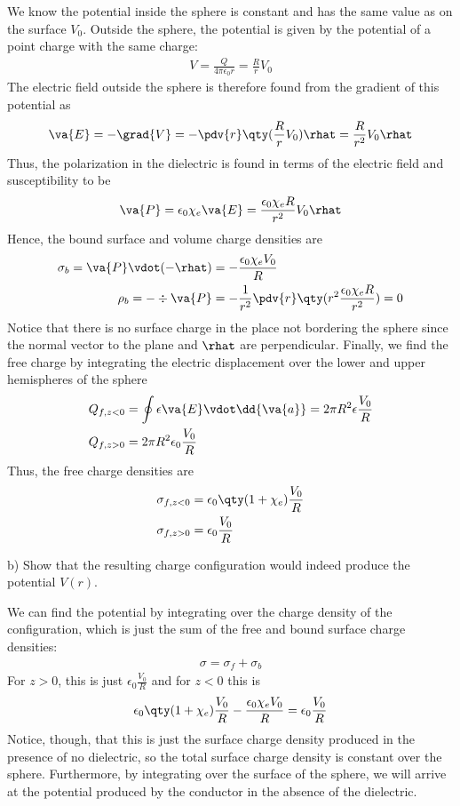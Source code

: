 \documentclass[12pt,a4paper]{article}
\begin{document}
We know the potential inside the sphere is constant and has the same value as on the surface $V_0$. Outside the sphere, the potential is given by the potential of a point charge with the same charge:
\begin{align*}
V = \frac{Q}{4\pi\epsilon_0 r} = \frac{R}{r}V_0
\end{align*}
The electric field outside the sphere is therefore found from the gradient of this potential as
\begin{align*}
\va{E} = -\grad{V} = -\pdv{r}\qty(\frac{R}{r}V_0)\rhat = \frac{R}{r^2}V_0\rhat
\end{align*}
Thus, the polarization in the dielectric is found in terms of the electric field and susceptibility to be
\begin{align*}
\va{P} = \epsilon_0\chi_e\va{E} = \frac{\epsilon_0\chi_eR}{r^2}V_0\rhat
\end{align*}
Hence, the bound surface and volume charge densities are
\begin{align*}
\sigma_b = \va{P} \vdot (-\rhat) &= -\frac{\epsilon_0\chi_eV_0}{R} \\
\rho_b = -\div{\va{P}} &= -\frac{1}{r^2}\pdv{r}\qty(r^2\frac{\epsilon_0\chi_eR}{r^2}) = 0
\end{align*}
Notice that there is no surface charge in the place not bordering the sphere since the normal vector to the plane and $\rhat$ are perpendicular. Finally, we find the free charge by integrating the electric displacement over the lower and upper hemispheres of the sphere
\begin{align*}
Q_{f,z<0} &= \oint \epsilon\va{E} \vdot \dd{\va{a}} = 2\pi R^2\epsilon\frac{V_0}{R} \\
Q_{f,z>0} &= 2\pi R^2\epsilon_0\frac{V_0}{R}
\end{align*}
Thus, the free charge densities are 
\begin{align*}
\sigma_{f,z<0} &= \epsilon_0\qty(1+\chi_e)\frac{V_0}{R} \\
\sigma_{f,z>0} &= \epsilon_0\frac{V_0}{R} 
\end{align*}

b) Show that the resulting charge configuration would indeed produce the potential $V(r)$.

We can find the potential by integrating over the charge density of the configuration, which is just the sum of the free and bound surface charge densities:
\begin{align*}
\sigma = \sigma_f + \sigma_b
\end{align*}
For $z > 0$, this is just $\epsilon_0\frac{V_0}{R}$ and for $z < 0$ this is
\begin{align*}
\epsilon_0\qty(1+\chi_e)\frac{V_0}{R} - \frac{\epsilon_0\chi_eV_0}{R} = \epsilon_0\frac{V_0}{R}
\end{align*}
Notice, though, that this is just the surface charge density produced in the presence of no dielectric, so the total surface charge density is constant over the sphere. Furthermore, by integrating over the surface of the sphere, we will arrive at the potential produced by the conductor in the absence of the dielectric.
\end{document}

